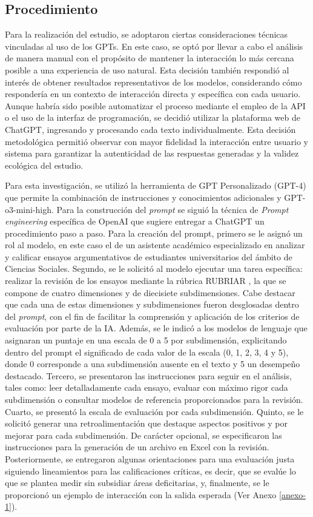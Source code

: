 \documentclass[spanish]{textolivre}
\begin{document}
\subsection{Procedimiento}
Para la realización del estudio, se adoptaron ciertas consideraciones técnicas vinculadas al uso de los GPTs. En este caso, se optó por llevar a cabo el análisis de manera manual con el propósito de mantener la interacción lo más cercana posible a una experiencia de uso natural. Esta decisión también respondió al interés de obtener resultados representativos de los modelos, considerando cómo respondería en un contexto de interacción directa y específica con cada usuario. Aunque habría sido posible automatizar el proceso mediante el empleo de la API o el uso de la interfaz de programación, se decidió utilizar la plataforma web de ChatGPT, ingresando y procesando cada texto individualmente. Esta decisión metodológica permitió observar con mayor fidelidad la interacción entre usuario y sistema para garantizar la autenticidad de las respuestas generadas y la validez ecológica del estudio.

Para esta investigación, se utilizó la herramienta de GPT Personalizado (GPT-4) que permite la combinación de instrucciones y conocimientos adicionales y GPT-o3-mini-high. Para la construcción del \textit{prompt} se siguió la técnica de \textit{Prompt engineering} específica de OpenAI que sugiere entregar a ChatGPT un procedimiento paso a paso. Para la creación del prompt, primero se le asignó un rol al modelo, en este caso el de un asistente académico especializado en analizar y calificar ensayos argumentativos de estudiantes universitarios del ámbito de Ciencias Sociales. Segundo, se le solicitó al modelo ejecutar una tarea específica: realizar la revisión de los ensayos mediante la rúbrica RUBRIAR \cite{kloss2024}, la que se compone de cuatro dimensiones y de diecisiete subdimensiones. Cabe destacar que cada una de estas dimensiones y subdimensiones fueron desglosadas dentro del \textit{prompt}, con el fin de facilitar la comprensión y aplicación de los criterios de evaluación por parte de la IA. Además, se le indicó a los modelos de lenguaje que asignaran un puntaje en una escala de 0 a 5 por subdimensión, explicitando dentro del prompt el significado de cada valor de la escala (0, 1, 2, 3, 4 y 5), donde 0 corresponde a una subdimensión ausente en el texto y 5 un desempeño destacado. Tercero, se presentaron las instrucciones para seguir en el análisis, tales como: leer detalladamente cada ensayo, evaluar con máximo rigor cada subdimensión o consultar modelos de referencia proporcionados para la revisión. Cuarto, se presentó la escala de evaluación por cada subdimensión. Quinto, se le solicitó generar una retroalimentación que destaque aspectos positivos y por mejorar para cada subdimensión. De carácter opcional, se especificaron las instrucciones para la generación de un archivo en Excel con la revisión. Posteriormente, se entregaron algunas orientaciones para una evaluación justa siguiendo lineamientos para las calificaciones críticas, es decir, que se evalúe lo que se plantea medir sin subsidiar áreas deficitarias, y, finalmente, se le proporcionó un ejemplo de interacción con la salida esperada (Ver Anexo \ref{anexo-1}).
\end{document}
